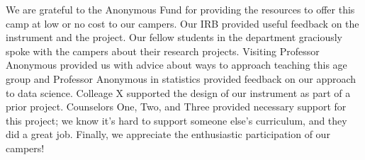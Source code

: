 \begin{acks}
\small
We are grateful to the Anonymous Fund for providing the resources
to offer this camp at low or no cost to our campers.  Our IRB provided
useful feedback on the instrument and the project.  Our fellow
students in the department graciously spoke with the campers about
their research projects.  Visiting Professor Anonymous provided us
with advice about ways to approach teaching this age group and
Professor Anonymous in statistics provided feedback on our approach
to data science.  Colleage X supported the design of our instrument
as part of a prior project.  Counselors One, Two, and Three provided
necessary support for this project; we know it's hard to support
someone else's curriculum, and they did a great job.  Finally, we
appreciate the enthusiastic participation of our campers!

\end{acks}

